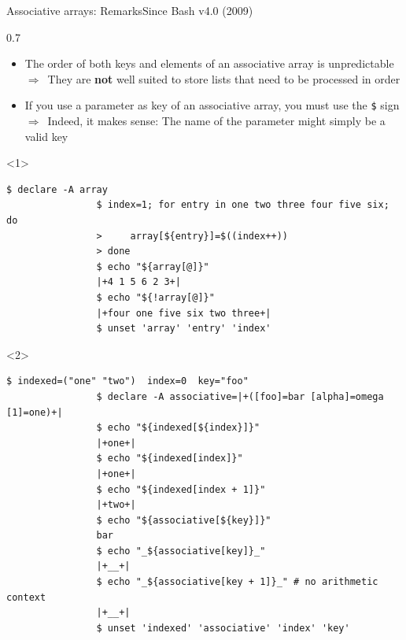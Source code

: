 \begin{frame}[fragile]{Associative arrays: Remarks}{Since Bash v4.0 (2009)}
    \begin{overlayarea}{\textwidth}{0.7\textheight}
        \begin{itemize}
            \item \alert{The order of both keys and elements} of an associative array is \alert{unpredictable}\\
                  $\Rightarrow\,$ They are \textbf{not} well suited to store lists that need to be processed in order
            \item If you use a parameter as key of an associative array, \alert{you must use the \texttt{\$} sign}\\
                  $\Rightarrow\,$ Indeed, it makes sense: The name of the parameter might simply be a valid key
        \end{itemize}
        \begin{onlyenv}<1>
            \begin{lstlisting}[style=MyBash]
                $ declare -A array
                $ index=1; for entry in one two three four five six; do
                >     array[${entry}]=$((index++))
                > done
                $ echo "${array[@]}"
                |+4 1 5 6 2 3+|
                $ echo "${!array[@]}"
                |+four one five six two three+|
                $ unset 'array' 'entry' 'index'
            \end{lstlisting}
        \end{onlyenv}
        \begin{onlyenv}<2>
            \begin{lstlisting}[style=MyBash, firstnumber=10, emph={[7]associative, indexed}]
                $ indexed=("one" "two")  index=0  key="foo"
                $ declare -A associative=|+([foo]=bar [alpha]=omega [1]=one)+|
                $ echo "${indexed[${index}]}"
                |+one+|
                $ echo "${indexed[index]}"
                |+one+|
                $ echo "${indexed[index + 1]}"
                |+two+|
                $ echo "${associative[${key}]}"
                bar
                $ echo "_${associative[key]}_"
                |+__+|
                $ echo "_${associative[key + 1]}_" # no arithmetic context
                |+__+|
                $ unset 'indexed' 'associative' 'index' 'key'
            \end{lstlisting}
        \end{onlyenv}
    \end{overlayarea}
\end{frame}
